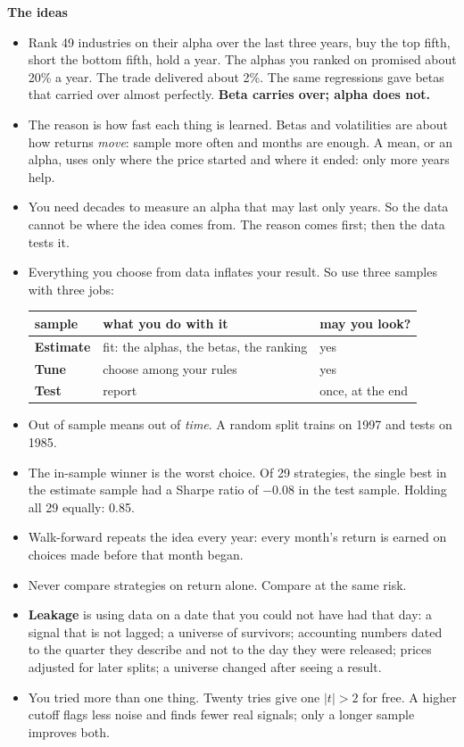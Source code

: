 \documentclass[11pt]{article}
\newcounter{ex}[section]
\newcommand{\head}[1]{\par\medskip\textbf{#1}\par}
\begin{document}
\head{The ideas}
\begin{itemize}
\item Rank 49 industries on their alpha over the last three years, buy the top fifth, short the bottom fifth, hold a
year. The alphas you ranked on promised about 20\% a year. The trade delivered about 2\%. The same regressions gave
betas that carried over almost perfectly. \textbf{Beta carries over; alpha does not.}
\item The reason is how fast each thing is learned. Betas and volatilities are about how returns \emph{move}: sample
more often and months are enough. A mean, or an alpha, uses only where the price started and where it ended: only
more years help.
\item You need decades to measure an alpha that may last only years. So the data cannot be where the idea comes from.
The reason comes first; then the data tests it.
\item Everything you choose from data inflates your result. So use three samples with three jobs:
\begin{center}
\begin{tabular}{lll}
\toprule
sample & what you do with it & may you look? \\
\midrule
\textbf{Estimate} & fit: the alphas, the betas, the ranking & yes \\
\textbf{Tune} & choose among your rules & yes \\
\textbf{Test} & report & once, at the end \\
\bottomrule
\end{tabular}
\end{center}
\item Out of sample means out of \emph{time}. A random split trains on 1997 and tests on 1985.
\item The in-sample winner is the worst choice. Of 29 strategies, the single best in the estimate sample had a Sharpe
ratio of $-0.08$ in the test sample. Holding all 29 equally: 0.85.
\item Walk-forward repeats the idea every year: every month's return is earned on choices made before that month began.
\item Never compare strategies on return alone. Compare at the same risk.
\item \textbf{Leakage} is using data on a date that you could not have had that day: a signal that is not lagged; a
universe of survivors; accounting numbers dated to the quarter they describe and not to the day they were released;
prices adjusted for later splits; a universe changed after seeing a result.
\item You tried more than one thing. Twenty tries give one $|t| > 2$ for free. A higher cutoff flags less noise and
finds fewer real signals; only a longer sample improves both.
\end{itemize}
\end{document}
